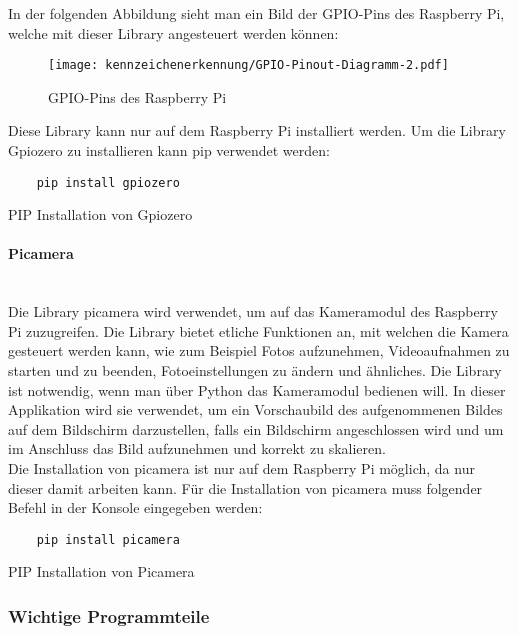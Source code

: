 In der folgenden Abbildung sieht man ein Bild der GPIO-Pins des Raspberry Pi, welche mit dieser Library angesteuert werden können:

\begin{figure}[H]
    \centering
    \texttt{[image: kennzeichenerkennung/GPIO-Pinout-Diagramm-2.pdf]}
    \caption{GPIO-Pins des Raspberry Pi}
\end{figure}

Diese Library kann nur auf dem Raspberry Pi installiert werden. Um die Library Gpiozero zu installieren kann pip verwendet werden:

\begin{listing}[H]
    \begin{verbatim}
    pip install gpiozero
    \end{verbatim}
    \caption{PIP Installation von Gpiozero}
\end{listing}

\paragraph{Picamera}\mbox{}\\
Die Library picamera wird verwendet, um auf das Kameramodul des Raspberry Pi zuzugreifen. Die Library bietet etliche Funktionen an, 
mit welchen die Kamera gesteuert werden kann, wie zum Beispiel Fotos aufzunehmen, Videoaufnahmen zu starten und zu beenden, Fotoeinstellungen 
zu ändern und ähnliches. Die Library ist notwendig, wenn man über Python das Kameramodul bedienen will. In dieser Applikation wird sie verwendet, 
um ein Vorschaubild des aufgenommenen Bildes auf dem Bildschirm darzustellen, falls ein Bildschirm angeschlossen wird und um im 
Anschluss das Bild aufzunehmen und korrekt zu skalieren.\\

Die Installation von picamera ist nur auf dem Raspberry Pi möglich, da nur dieser damit arbeiten kann. 
Für die Installation von picamera muss folgender Befehl in der Konsole eingegeben werden:

\begin{listing}[H]
    \begin{verbatim}
    pip install picamera
    \end{verbatim}
    \caption{PIP Installation von Picamera}
\end{listing}

\subsubsection{Wichtige Programmteile}

